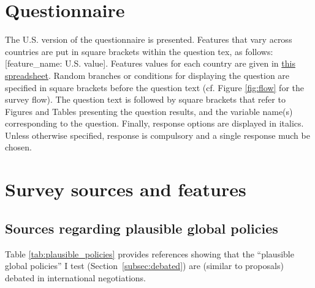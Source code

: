 

\renewcommand{\theenumi}{\arabic{enumi}}
\clearpage
\section{Questionnaire}\label{app:questionnaire}
The U.S. version of the questionnaire is presented. Features that vary across countries are put in square brackets within the question tex, as follows: [feature\_name: U.S. value]. Features values for each country are given in \href{https://github.com/bixiou/robustness_global_redistr/raw/main/questionnaire/sources.xlsx}{this spreadsheet}. 
Random branches or conditions for displaying the question are specified in square brackets before the question text (cf. Figure \ref{fig:flow} for the survey flow). The question text is followed by square brackets that refer to Figures and Tables presenting the question results, and the variable name(s) corresponding to the question. Finally, response options are displayed in italics. 
Unless otherwise specified, response is compulsory and a single response much be chosen.



\clearpage
\section{Survey sources and features}\label{app:features}

\subsection{Sources regarding plausible global policies}\label{subsec:plausible_policies_sources}

Table \ref{tab:plausible_policies} provides references showing that the ``plausible global policies'' I test (Section~\ref{subsec:debated}) are (similar to proposals) debated in international negotiations.


